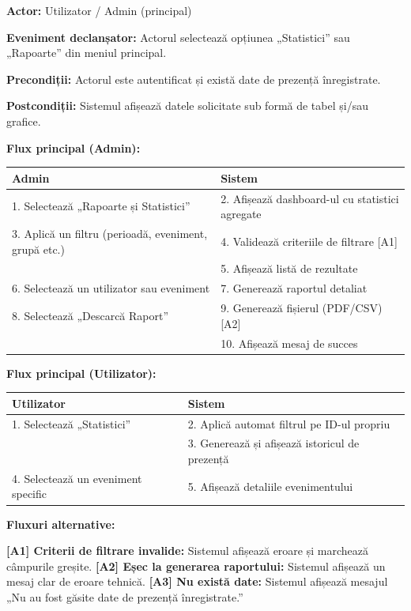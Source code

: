 \documentclass[a4paper,12pt,oneside]{report}
\begin{document}
\textbf{Actor:} Utilizator / Admin (principal)

\textbf{Eveniment declanșator:} Actorul selectează opțiunea „Statistici” sau „Rapoarte” din meniul principal.

\textbf{Precondiții:} Actorul este autentificat și există date de prezență înregistrate.

\textbf{Postcondiții:} Sistemul afișează datele solicitate sub formă de tabel și/sau grafice.

\textbf{Flux principal (Admin):}

\begin{tabular}{l l}
\hline
\textbf{Admin} & \textbf{Sistem} \\
\hline
1. Selectează „Rapoarte și Statistici” & 2. Afișează dashboard-ul cu statistici agregate \\
3. Aplică un filtru (perioadă, eveniment, grupă etc.) & 4. Validează criteriile de filtrare [A1] \\
 & 5. Afișează listă de rezultate \\
6. Selectează un utilizator sau eveniment & 7. Generează raportul detaliat \\
8. Selectează „Descarcă Raport” & 9. Generează fișierul (PDF/CSV) [A2] \\
 & 10. Afișează mesaj de succes \\
\hline
\end{tabular}

\textbf{Flux principal (Utilizator):}

\begin{tabular}{l l}
\hline
\textbf{Utilizator} & \textbf{Sistem} \\
\hline
1. Selectează „Statistici” & 2. Aplică automat filtrul pe ID-ul propriu \\
 & 3. Generează și afișează istoricul de prezență \\
4. Selectează un eveniment specific & 5. Afișează detaliile evenimentului \\
\hline
\end{tabular}

\textbf{Fluxuri alternative:}

\textbf{[A1] Criterii de filtrare invalide:} Sistemul afișează eroare și marchează câmpurile greșite. \newline
\textbf{[A2] Eșec la generarea raportului:} Sistemul afișează un mesaj clar de eroare tehnică. \newline
\textbf{[A3] Nu există date:} Sistemul afișează mesajul „Nu au fost găsite date de prezență înregistrate.”
\end{document}
